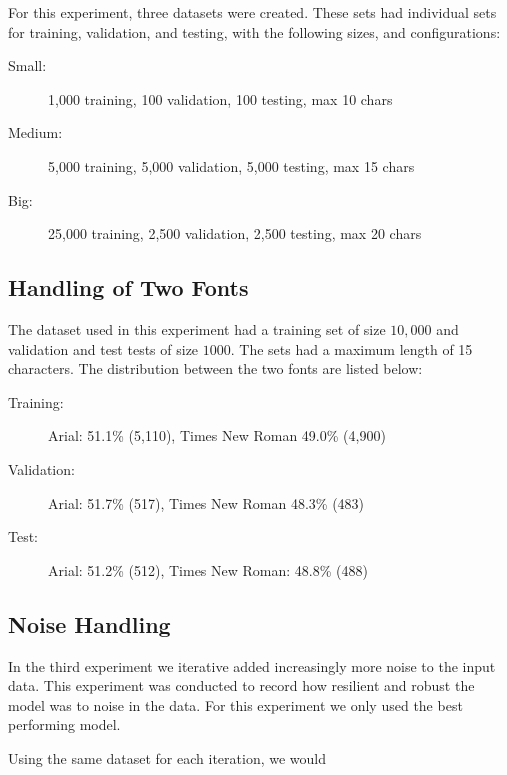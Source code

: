 For this experiment, three datasets were created. These sets had individual sets for training, validation, and testing, with the following sizes, and configurations:

\vspace{0.5cm}
\begin{minipage}{0.8\linewidth}
    \begin{description}
        \item[Small:]{1,000 training, 100 validation, 100 testing, max 10 chars}
        \item[Medium:]{5,000 training, 5,000 validation, 5,000 testing, max 15 chars}
        \item[Big:]{25,000 training, 2,500 validation, 2,500 testing, max 20 chars}
    \end{description}
\end{minipage}

\subsection{Handling of Two Fonts}
The dataset used in this experiment had a training set of size \(10,000\) and validation and test tests of size \(1000\). The sets had a maximum length of 15 characters. The distribution between the two fonts are listed below:

\vspace{0.5cm}
\begin{minipage}{0.8\linewidth}
    \begin{description}
        \item[Training:]{Arial: 51.1\% (5,110), Times New Roman 49.0\% (4,900)}
        \item[Validation:]{Arial: 51.7\% (517), Times New Roman 48.3\% (483)}
        \item[Test:]{Arial: 51.2\% (512), Times New Roman: 48.8\% (488)}
    \end{description}
\end{minipage}

\subsection{Noise Handling}
In the third experiment we iterative added increasingly more noise to the input data. This experiment was conducted to record how resilient and robust the model was to noise in the data. For this experiment we only used the best performing model. 

Using the same dataset for each iteration, we would 


